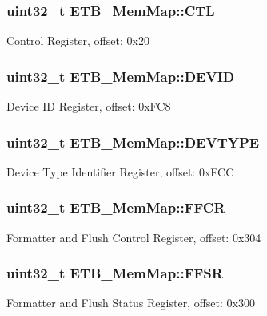 \subsubsection[{C\+T\+L}]{\setlength{\rightskip}{0pt plus 5cm}uint32\+\_\+t E\+T\+B\+\_\+\+Mem\+Map\+::\+C\+T\+L}\label{struct_e_t_b___mem_map_a12988dd241cd1b4936f513afcd6fa803}
Control Register, offset\+: 0x20 \hypertarget{struct_e_t_b___mem_map_a135d6824f41332aa21abb897832a19a4}{}
\subsubsection[{D\+E\+V\+I\+D}]{\setlength{\rightskip}{0pt plus 5cm}uint32\+\_\+t E\+T\+B\+\_\+\+Mem\+Map\+::\+D\+E\+V\+I\+D}\label{struct_e_t_b___mem_map_a135d6824f41332aa21abb897832a19a4}
Device I\+D Register, offset\+: 0x\+F\+C8 \hypertarget{struct_e_t_b___mem_map_a7c8b85bd88e8e639a4a75216ab918c88}{}
\subsubsection[{D\+E\+V\+T\+Y\+P\+E}]{\setlength{\rightskip}{0pt plus 5cm}uint32\+\_\+t E\+T\+B\+\_\+\+Mem\+Map\+::\+D\+E\+V\+T\+Y\+P\+E}\label{struct_e_t_b___mem_map_a7c8b85bd88e8e639a4a75216ab918c88}
Device Type Identifier Register, offset\+: 0x\+F\+C\+C \hypertarget{struct_e_t_b___mem_map_a80b6d342085b83ee0a5ede7f9651bd59}{}
\subsubsection[{F\+F\+C\+R}]{\setlength{\rightskip}{0pt plus 5cm}uint32\+\_\+t E\+T\+B\+\_\+\+Mem\+Map\+::\+F\+F\+C\+R}\label{struct_e_t_b___mem_map_a80b6d342085b83ee0a5ede7f9651bd59}
Formatter and Flush Control Register, offset\+: 0x304 \hypertarget{struct_e_t_b___mem_map_a329d4e3cc86aa6064657bb9a37096e31}{}
\subsubsection[{F\+F\+S\+R}]{\setlength{\rightskip}{0pt plus 5cm}uint32\+\_\+t E\+T\+B\+\_\+\+Mem\+Map\+::\+F\+F\+S\+R}\label{struct_e_t_b___mem_map_a329d4e3cc86aa6064657bb9a37096e31}
Formatter and Flush Status Register, offset\+: 0x300 \hypertarget{struct_e_t_b___mem_map_a9da4a06848bfc47161b31c234eaaeb81}{}
